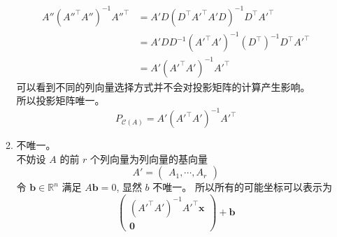\documentclass[11pt,letter,notitlepage]{article}
\begin{document}
\begin{solution}
\begin{enumerate}
\begin{enumerate}
                        $$\begin{aligned}
                            A''\left(A''^\top A''\right)^{-1} A''^\top
                            &= A'D \left( D^\top A'^\top A' D \right)^{-1} D^\top A'^\top \\
                            &=A' D D^{-1} \left( A'^\top A' \right)^{-1} \left(D^\top\right)^{-1}D^\top A'^\top \\
                            &=A' \left( A'^\top A' \right)^{-1} A'^\top
                        \end{aligned}$$
                        可以看到不同的列向量选择方式并不会对投影矩阵的计算产生影响。\\
                        所以投影矩阵唯一。
                        $$P_{\mathcal{C}(A)}=A' \left( A'^\top A' \right)^{-1}A'^\top$$
                  \item 不唯一。\\
                    不妨设 $A$ 的前 $r$ 个列向量为列向量的基向量
                    $$A' =\begin{pmatrix}
                        A_1, \cdots, A_r
                    \end{pmatrix}$$
                    令 $\mathbf{b} \in \mathbb{R}^n$ 满足 $A \mathbf{b} =0$, 显然 $b$ 不唯一。
                    所以所有的可能坐标可以表示为
                    $$\begin{pmatrix}
                        \left( A'^\top A' \right)^{-1}A'^\top \mathbf{x} \\
                        \mathbf{0}
                    \end{pmatrix}+\mathbf{b}$$
              \end{enumerate}
    \end{enumerate}
\end{solution}

\newpage
\end{document}
